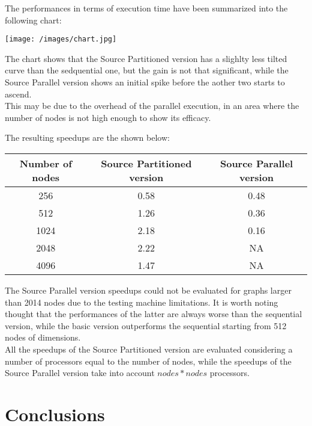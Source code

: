 \documentclass[
	a4paper, %
	12pt, %
]{class}
\begin{document}
The performances in terms of execution time have been summarized into the following chart:

\begin{center}
    \texttt{[image: /images/chart.jpg]}
\end{center}

The chart shows that the Source Partitioned version has a slighlty less tilted curve than the sedquential one, but the gain is not
that significant, while the Source Parallel version shows an initial spike before the aother two starts to ascend. \\

This may be due to the overhead of the parallel execution, in an area where the number of nodes is not high enough to show its efficacy.
\newpage

The resulting speedups are the shown below:

\begin{center}
    \begin{tabular}{ |c|c|c| }
    \hline
    \textbf{Number of nodes} & \textbf{Source Partitioned version} & \textbf{Source Parallel version} \\ \hline
    256 & 0.58  & 0.48 \\ \hline
    512 & 1.26 & 0.36 \\ \hline
    1024 & 2.18 & 0.16 \\ \hline
    2048 & 2.22 & NA \\ \hline
    4096 & 1.47 & NA \\ \hline
    \end{tabular}
\end{center}

The Source Parallel version speedups could not be evaluated for graphs larger than 2014 nodes due to the testing machine
limitations. It is worth noting thought that the performances of the latter are always worse than the sequential version, while the basic
version outperforms the sequential starting from 512 nodes of dimensions. \\

All the speedups of the Source Partitioned version are evaluated considering a number of processors equal to the number of nodes, while the speedups
of the Source Parallel version take into account $nodes * nodes$ processors.

\section{Conclusions}
\end{document}
